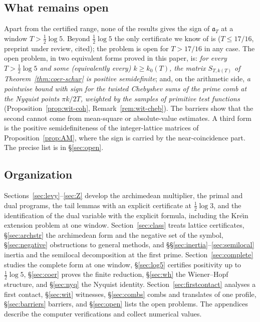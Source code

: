 \documentclass[11pt]{amsart}
\theoremstyle{definition}
\theoremstyle{remark}
\begin{document}
\subsection{What remains open}
Apart from the certified range, none of the results gives the sign of $\mathfrak a_T$ at a window
$T>\frac12\log5$. Beyond $\frac12\log5$ the only certificate we know of is \cite{Liu2026}
($T\le17/16$, preprint under review, cited); the problem is open for $T>17/16$ in any case. The open problem, in two equivalent forms proved in this paper, is: \emph{for every
$T>\frac12\log5$ and some (equivalently every) $k\ge k_0(T)$, the matrix $S_{T,k(T)}$ of
Theorem~\ref{thm:coer-schur} is positive semidefinite}; and, on the arithmetic side, \emph{a pointwise bound with
sign for the twisted Chebyshev sums of the prime comb at the Nyquist points $\pi k/2T$, weighted by the samples
of primitive test functions} (Proposition~\ref{prop:wit-coh}, Remark~\ref{rem:wit-cheb}). The barriers show that
the second cannot come from mean-square or absolute-value estimates. A third form is the positive semidefiniteness of the
integer-lattice matrices of Proposition~\ref{prop:AM}, where the sign is carried by the near-coincidence part. The precise
list is in \S\ref{sec:open}.

\subsection{Organization}
Sections~\ref{sec:levy}--\ref{sec:Z} develop the archimedean multiplier, the primal and dual programs, the tail
lemmas with an explicit certificate at $\frac12\log3$, and the identification of the dual variable with the
explicit formula, including the Kre\u{\i}n extension problem at one window. Section~\ref{sec:class} treats lattice
certificates, \S\ref{sec:archstr} the archimedean form and the negative set of the symbol, \S\ref{sec:negative}
obstructions to general methods, and \S\S\ref{sec:inertia}--\ref{sec:semilocal} inertia and the semilocal
decomposition at the first prime. Section~\ref{sec:complete} studies the complete form at one window,
\S\ref{sec:log5} certifies positivity up to $\frac12\log5$, \S\ref{sec:coer} proves the finite reduction,
\S\ref{sec:wh} the Wiener--Hopf structure, and \S\ref{sec:nyq} the Nyquist identity. Section~\ref{sec:firstcontact}
analyses a first contact, \S\ref{sec:wit} witnesses, \S\ref{sec:combs} combs and translates of one profile,
\S\ref{sec:barriers} barriers, and \S\ref{sec:open} lists the
open problems. The appendices describe the computer verifications and collect numerical values.
\end{document}
